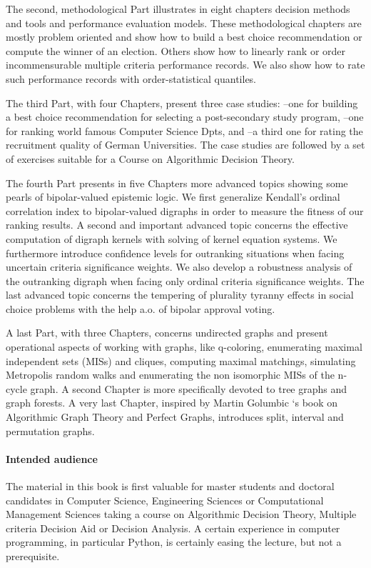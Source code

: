 The second, methodological Part illustrates in eight chapters decision methods and tools and performance evaluation models. These methodological chapters are mostly problem oriented and show how to build a best choice recommendation or compute the winner of an election. Others show how to linearly rank or order incommensurable multiple criteria performance records. We also show how to rate such performance records with order-statistical quantiles.

The third Part, with four Chapters, present three case studies: --one for building a best choice recommendation for selecting a post-secondary study program, --one for ranking world famous Computer Science Dpts, and --a third one for rating the recruitment quality of German Universities. The case studies are followed by a set of exercises suitable for a Course on Algorithmic Decision Theory.

The fourth Part presents in five Chapters more advanced topics showing some pearls of bipolar-valued epistemic logic. We first generalize Kendall's ordinal correlation index to bipolar-valued digraphs in order to measure the fitness of our ranking results. A second and important advanced topic concerns the effective computation of digraph kernels with solving of \Berge kernel equation systems. We furthermore introduce confidence levels for outranking situations when facing uncertain criteria significance weights. We also develop a robustness analysis of the outranking digraph when facing only ordinal criteria significance weights. The last advanced topic concerns the tempering of plurality tyranny effects in social choice problems with the help a.o. of bipolar approval voting. 

A last Part, with three Chapters, concerns undirected graphs and present operational aspects of working with graphs, like q-coloring, enumerating maximal independent sets (MISs) and cliques, computing maximal matchings, simulating Metropolis random walks and enumerating the non isomorphic MISs of the n-cycle graph. A second Chapter is more specifically devoted to tree graphs and graph forests. A very last Chapter, inspired by Martin Golumbic ‘s book on Algorithmic Graph Theory and Perfect Graphs, introduces split, interval and permutation graphs.

\paragraph{Intended audience}

The material in this book is first valuable for master students and doctoral candidates in Computer Science, Engineering Sciences or Computational Management Sciences taking a course on Algorithmic Decision Theory, Multiple criteria Decision Aid or Decision Analysis. A certain experience in computer programming, in particular Python, is certainly easing the lecture, but not a prerequisite.

